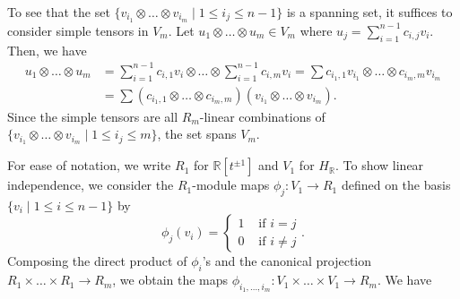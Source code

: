 \documentclass{amsart}
\makeatletter
\renewenvironment{proof}[1][\proofname]{%
   \par\pushQED{\qed}\normalfont%
   \topsep6\p@\@plus6\p@\relax
   \trivlist\item[\hskip\labelsep\bfseries#1\@addpunct{.}]%
   \ignorespaces
}{%
   \popQED\endtrivlist\@endpefalse
}
\makeatother
\begin{document}
\begin{proof}
    To see that the set $\{v_{i_1}\otimes \dots \otimes v_{i_m} \mid 1 \leq i_j \leq n-1 \}$ is a spanning set, it suffices to consider simple tensors in $V_m$. Let $u_1\otimes \dots \otimes u_m \in V_m$ where $\displaystyle u_j = \sum^{n-1}_{i=1} c_{i,j}v_{i}$. Then, we have 
    \begin{align*}
    u_1\otimes \dots \otimes u_m 
    &= \sum^{n-1}_{i=1} c_{i,1}v_{i}\otimes \dots \otimes\sum^{n-1}_{i=1} c_{i,m}v_{i} = \sum c_{i_1,1} v_{i_1}\otimes\dots\otimes c_{i_m,m}  v_{i_m} \\
    &=\sum (c_{i_1,1}\otimes\dots\otimes c_{i_m,m} )(v_{i_1} \otimes \dots \otimes v_{i_m}).
    \end{align*}
    Since the simple tensors are all $R_m$-linear combinations of $\{ v_{i_1} \otimes \dots \otimes v_{i_m} \mid 1 \leq i_j \leq m \}$, the set spans $V_m$. 
    
    For ease of notation, we write $R_1$ for $\mathbb{R}[t^{\pm 1}]$ and $V_1$ for $H_{\mathbb{R}}$. To show linear independence, we consider the $R_1$-module maps $\phi_j: V_1 \to R_1$ defined on the basis $\{v_i \mid 1 \leq i \leq n-1\}$ by
    \[
    \phi_j(v_i) = \begin{cases}
        1 & \text{ if } i = j \\
        0 & \text{ if } i \neq j
    \end{cases}.
    \]
    Composing the direct product of $\phi_i$'s and the canonical projection $R_1 \times \dots \times R_1 \to R_m$, we obtain the maps $\phi_{i_1,\dots,i_m}:V_1 \times \dots \times V_1 \to R_m$. We have


\end{proof}
\end{document}
